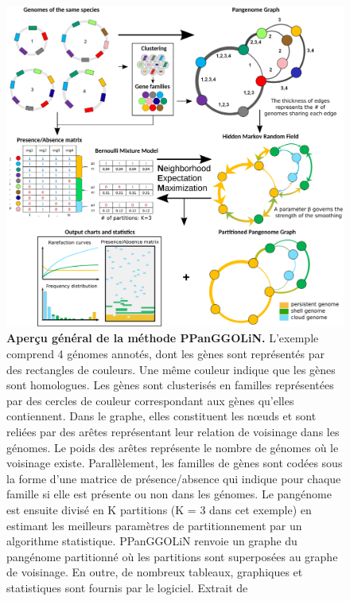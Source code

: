 \begin{figure}[htbp]
    \centering
    \includegraphics[width=\linewidth]{images/PPanGGOLiN.png}
    \caption[Aperçu général de la méthode PPanGGOLiN]{\textbf{Aperçu général de la méthode PPanGGOLiN.} L'exemple comprend 4 génomes annotés, dont les gènes sont représentés par des rectangles de couleurs. Une même couleur indique que les gènes sont homologues. Les gènes sont clusterisés en familles représentées par des cercles de couleur correspondant aux gènes qu'elles contiennent. Dans le graphe, elles constituent les n\oe uds et sont reliées par des arêtes représentant leur relation de voisinage dans les génomes. Le poids des arêtes représente le nombre de génomes où le voisinage existe. Parallèlement, les familles de gènes sont codées sous la forme d'une matrice de présence/absence qui indique pour chaque famille si elle est présente ou non dans les génomes. Le pangénome est ensuite divisé en K partitions (K = 3 dans cet exemple) en estimant les meilleurs paramètres de partitionnement par un algorithme statistique. PPanGGOLiN renvoie un graphe du pangénome partitionné où les partitions sont superposées au graphe de voisinage. En outre, de nombreux tableaux, graphiques et statistiques sont fournis par le logiciel. Extrait de \cite{gautreau_conceptualisation_2020}}
    \label{fig:ppanggolin}
\end{figure}

